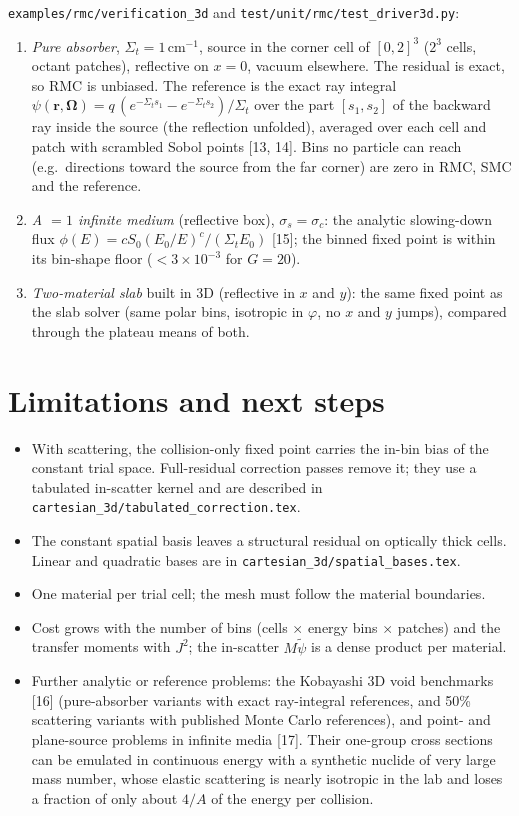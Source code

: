 \documentclass[11pt]{article}
\newcommand{\tpsi}{\tilde\psi}
\newcommand{\Sigt}{\Sigma_t}
\newcommand{\Om}{\boldsymbol\Omega}
\begin{document}
\texttt{examples/rmc/verification\_3d} and \texttt{test/unit/rmc/test\_driver3d.py}:
\begin{enumerate}
  \item \emph{Pure absorber}, $\Sigt=1$\,cm$^{-1}$, source in the corner cell of
  $[0,2]^3$ ($2^3$ cells, octant patches), reflective on $x=0$, vacuum elsewhere. The
  residual is exact, so RMC is unbiased. The reference is the exact ray integral
  $\psi(\mathbf r,\Om) = q\,(e^{-\Sigt s_1}-e^{-\Sigt s_2})/\Sigt$ over the part
  $[s_1,s_2]$ of the backward ray inside the source (the reflection unfolded),
  averaged over each cell and patch with scrambled Sobol points [13, 14]. Bins no
  particle can reach (e.g.\ directions toward the source from the far corner) are
  zero in RMC, SMC and the reference.
  \item \emph{A $=1$ infinite medium} (reflective box), $\sigma_s=\sigma_c$: the
  analytic slowing-down flux $\phi(E)=cS_0(E_0/E)^c/(\Sigt E_0)$ [15]; the
  binned fixed point is within its bin-shape floor ($<3\times10^{-3}$ for $G=20$).
  \item \emph{Two-material slab} built in 3D (reflective in $x$ and $y$): the same
  fixed point as the slab solver (same polar bins, isotropic in $\varphi$, no $x$
  and $y$ jumps), compared through the plateau means of both.
\end{enumerate}

\section{Limitations and next steps}

\begin{itemize}
  \item With scattering, the collision-only fixed point carries the in-bin bias of
  the constant trial space. Full-residual correction passes remove it; they use a
  tabulated in-scatter kernel and are described in
  \texttt{cartesian\_3d/tabulated\_correction.tex}.
  \item The constant spatial basis leaves a structural residual on optically thick
  cells. Linear and quadratic bases are in
  \texttt{cartesian\_3d/spatial\_bases.tex}.
  \item One material per trial cell; the mesh must follow the material boundaries.
  \item Cost grows with the number of bins (cells $\times$ energy bins $\times$
  patches) and the transfer moments with $J^2$; the in-scatter $M\tpsi$ is a dense
  product per material.
  \item Further analytic or reference problems: the Kobayashi 3D void benchmarks
  [16] (pure-absorber variants with exact ray-integral references, and 50\%
  scattering variants with published Monte Carlo references), and point- and
  plane-source problems in infinite media [17]. Their one-group cross sections can be
  emulated in continuous energy with a synthetic nuclide of very large mass number,
  whose elastic scattering is nearly isotropic in the lab and loses a fraction of
  only about $4/A$ of the energy per collision.
\end{itemize}
\end{document}
